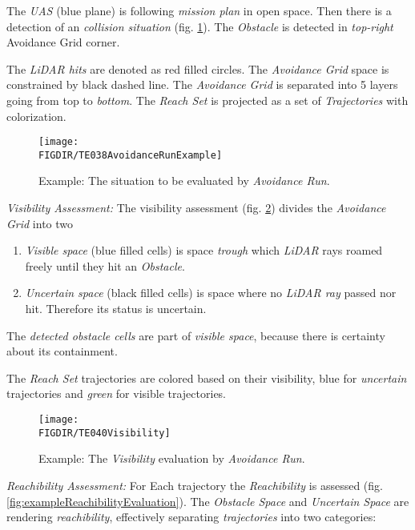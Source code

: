 The \emph{UAS} (blue plane) is following \emph{mission plan} in open space. Then there is a detection of an \emph{collision situation} (fig. \ref{fig:exampleSituationAvoidanceRun}). The \emph{Obstacle} is detected in \emph{top-right} Avoidance Grid corner. 

The \emph{LiDAR hits} are denoted as red filled circles. The \emph{Avoidance Grid} space is constrained by black dashed line. The \emph{Avoidance Grid} is separated into 5 layers going from top to \emph{bottom}. The \emph{Reach Set} is projected as a set of \emph{Trajectories} with colorization. 

\begin{figure}[H]
\centering
    \texttt{[image: \\FIGDIR/TE038AvoidanceRunExample]}        
    \caption{Example: The situation to be evaluated by \emph{Avoidance Run}.}
    \label{fig:exampleSituationAvoidanceRun}
\end{figure}
\newpage
\noindent\emph{Visibility Assessment:} The visibility assessment (fig. \ref{fig:exampleVisibilityEvaluation}) divides the \emph{Avoidance Grid} into two
\begin{enumerate}
    \item \emph{Visible space} (blue filled cells) is space \emph{trough} which \emph{LiDAR} rays roamed freely until they hit an \emph{Obstacle}.
    
    \item \emph{Uncertain space} (black filled cells) is space where no \emph{LiDAR ray} passed nor hit. Therefore its status is uncertain.
\end{enumerate}
 
 \begin{note}
     The \emph{detected obstacle cells} are part of \emph{visible space}, because there is certainty about its containment.
 \end{note}
 
 The \emph{Reach Set} trajectories are colored based on their visibility, blue for \emph{uncertain} trajectories and \emph{green} for visible trajectories.

\begin{figure}[H]
    \centering
    \texttt{[image: \\FIGDIR/TE040Visibility]}        
    \caption{Example: The \emph{Visibility} evaluation by \emph{Avoidance Run}.}
    \label{fig:exampleVisibilityEvaluation}
\end{figure}

\newpage
\noindent\emph{Reachibility Assessment:} For Each trajectory the \emph{Reachibility} is assessed (fig. \ref{fig:exampleReachibilityEvaluation}). The \emph{Obstacle Space} and \emph{Uncertain Space} are rendering \emph{reachibility}, effectively separating \emph{trajectories} into two categories:

